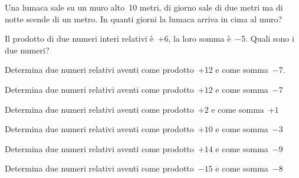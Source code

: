 \begin{multicols}{2}

\begin{esercizio}
 Una lumaca sale su un muro alto~10 metri, di giorno sale di due metri ma di 
notte
scende di un metro. In quanti giorni la lumaca arriva in cima al muro?
\end{esercizio}

% 

\begin{esercizio}
 Il prodotto di due numeri interi relativi è~\(+6\), la loro somma è~\(-\)5. Quali 
sono i due numeri?
\end{esercizio}


\begin{esercizio}
 Determina due numeri relativi aventi come prodotto~\(+\)12 e come somma~\(-\)7.
\end{esercizio}

\begin{esercizio}
 Determina due numeri relativi aventi come prodotto~\(+12\) e come somma~\(-7\)
\end{esercizio}

\begin{esercizio}
 Determina due numeri relativi aventi come prodotto~\(+2\) e come somma~\(+1\)
\end{esercizio}

\begin{esercizio}
 Determina due numeri relativi aventi come prodotto~\(+10\) e come somma~\(-3\)
\end{esercizio}

\begin{esercizio}
 Determina due numeri relativi aventi come prodotto~\(+14\) e come somma~\(-9\)
\end{esercizio}

\begin{esercizio}
 Determina due numeri relativi aventi come prodotto~\(-15\) e come somma~\(-8\)
\end{esercizio}

\end{multicols}
